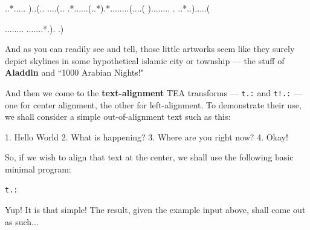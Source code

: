 \documentclass[a4paper, 18pt]{book} %
\begin{document}
{{{\vspace{2em}



     \begin{tcbverbatim}[title=T: SAMPLE OUTPUT 3 from EXAMPLE 3]
..*.....
)..(..
....(..
.*......(..*).*........(....(
)........
.
..*..).....(

........
.......*.).
.)
  \end{tcbverbatim}


\vspace{2em}

And as you can readily see and tell, those little artworks seem like they surely depict skylines in some hypothetical islamic city or township --- the stuff of \textbf{Aladdin} and ``1000 Arabian Nights!"

\vspace{2em}

And then we come to the \textbf{text-alignment} TEA transforms --- \texttt{t.:} and \texttt{t!.:} --- one for center alignment, the other for left-alignment. To demonstrate their use, we shall consider a simple out-of-alignment text such as this:


\vspace{2em}


     \begin{tcbverbatim}[title=T: SAMPLE misaligned text]
 1. Hello World
2. What is happening?
        3. Where are you right now?
      4. Okay!
  \end{tcbverbatim}
  
  
 \vspace{2em}
 
 So, if we wish to align that text at the center, we shall use the following basic minimal program:
 
  \vspace{2em}
 
  \begin{tcolorbox}[teaterminalstyle, title=T: EXAMPLE 4: Basic Center-alignment Program, breakable]
  \begin{lstlisting}[language=TEA,breaklines=true,]
t.:
   \end{lstlisting}
  \end{tcolorbox}

\vspace{1em}

Yup! It is that simple! The result, given the example input above, shall come out as such...

\vspace{2em}


}}}
\end{document}
